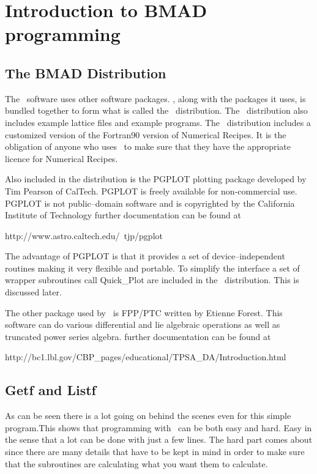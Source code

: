 \chapter{Introduction to BMAD programming}

\section{The BMAD Distribution}

The \bmad\ software uses other software packages. \bmad, along with the packages it uses, 
is bundled together to form what is called the \bmad\ distribution. The \bmad\ distribution
also includes example lattice files and example programs. The \bmad\ distribution includes a customized version of the Fortran90 version of Numerical Recipes\cite{nr}. It is the obligation of anyone who uses \bmad\ to make sure that they have the appropriate licence for Numerical Recipes. 

Also included in the distribution is the PGPLOT plotting package developed by Tim Pearson of CalTech.
PGPLOT is freely available for non-commercial use. PGPLOT is not public--domain software and is copyrighted by the California Institute of Technology further documentation can be found at
\begin{example}
    http://www.astro.caltech.edu/~tjp/pgplot
\end{example}
The advantage of PGPLOT is that it provides a set of device--independent routines making it very flexible and portable. To simplify the interface a set of wrapper subroutines call Quick\_Plot are
included in the \bmad\ distribution. This is discussed later.

The other package used by \bmad\ is FPP/PTC written by Etienne Forest. This software can do 
various differential and lie algebraic operations as well as truncated power series algebra. further
documentation can be found at
\begin{example}
    http://bc1.lbl.gov/CBP_pages/educational/TPSA_DA/Introduction.html
\end{example}

\section{Getf and Listf}

As can be seen there is a lot going on behind the scenes even for this
simple program.This shows that programming with \bmad\ can be both easy
and hard. Easy in the sense that a lot can be done with just a few
lines. The hard part comes about since there are many details that
have to be kept in mind in order to make sure that the subroutines
are calculating what you want them to calculate.

